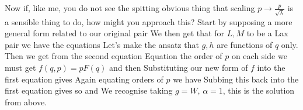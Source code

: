 \documentclass{article}
\begin{document}
Now if, like me, you do not see the spitting obvious thing that scaling $p \to \frac{p}{\sqrt{\lambda}}$ is a sensible thing to do, how might you approach this? Start by supposing a more general form related to our original pair 
We then get that for $L,M$ to be a Lax pair we have the equations 
Let's make the ansatz that $g,h$ are functions of $q$ only. Then we get from the second equation 
Equation the order of $p$ on each side we must get $f(q,p) = pF(q)$ and then 
Substituting our new form of $f$ into the first equation gives 
Again equating orders of $p$ we have 
Subbing this back into the first equation gives 
so 
and 
We recognise taking $g=W, \, \alpha=1$, this is the solution from above.

\end{document}
